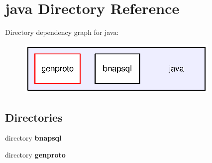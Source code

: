 \section{java Directory Reference}
\label{dir_93c6ba7fb77bae0709fae89c9c13b44a}
Directory dependency graph for java\+:\nopagebreak
\begin{figure}[H]
\begin{center}
\leavevmode
\includegraphics[width=276pt]{dir_93c6ba7fb77bae0709fae89c9c13b44a_dep}
\end{center}
\end{figure}
\subsection*{Directories}
\begin{DoxyCompactItemize}
\item 
directory {\bf bnapsql}
\item 
directory {\bf genproto}
\end{DoxyCompactItemize}
